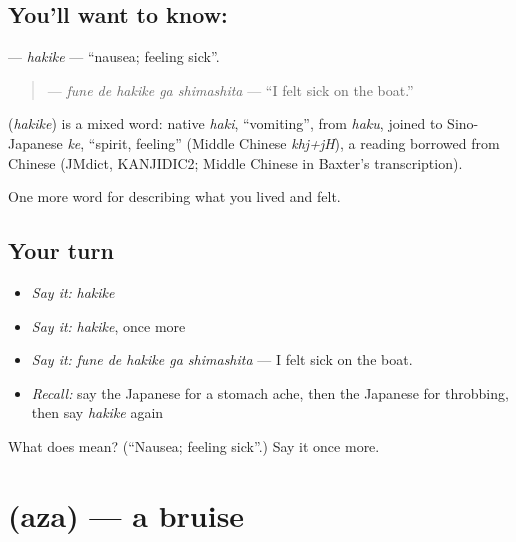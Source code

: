 \subsection*{You'll want to know: }
\textbf{} — \emph{hakike} — \textquotedblleft{}nausea; feeling sick\textquotedblright{}.

\begin{quote}
\textbf{  } — \emph{fune de hakike ga shimashita} — \textquotedblleft{}I felt sick on the boat.\textquotedblright{}
\end{quote}

\begin{cousinweb}
\textbf{} (\emph{hakike}) is a mixed word: native \emph{haki}, \textquotedblleft{}vomiting\textquotedblright{}, from \emph{haku}, joined to Sino-Japanese \emph{ke}, \textquotedblleft{}spirit, feeling\textquotedblright{} (Middle Chinese \emph{khj+jH}), a reading borrowed from Chinese (JMdict, KANJIDIC2; Middle Chinese in Baxter's transcription).
\end{cousinweb}

\begin{grammarlens}[title={What you've built}]
One more word for describing what you lived and felt.
\end{grammarlens}

\subsection*{Your turn}
\begin{itemize}
\raggedright
  \item \emph{Say it:} \emph{hakike}
  \item \emph{Say it:} \emph{hakike}, once more
  \item \emph{Say it:} \emph{fune de hakike ga shimashita} — I felt sick on the boat.
  \item \emph{Recall:} say the Japanese for a stomach ache, then the Japanese for throbbing, then say \emph{hakike} again
\end{itemize}

\begin{tcolorbox}[breakable,colback=teal!4,colframe=teal!35!black,title={Before you move on}]
What does  mean? (\textquotedblleft{}Nausea; feeling sick\textquotedblright{}.) Say it once more.
\end{tcolorbox}
\section[\texorpdfstring{\ja{あざ} (aza)}{あざ (aza)}]{ (aza) — a bruise}

